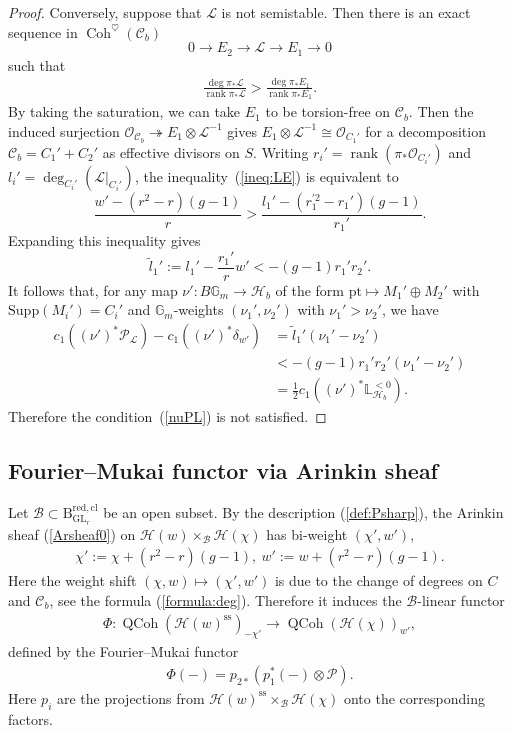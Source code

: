 \documentclass[11pt,oneside,a4paper,mathscr]{amsart}
\theoremstyle{definition}
\newcommand{\QCoh}{\operatorname{QCoh}}
\newcommand{\cH}{\mathcal{H}}
\newcommand{\cB}{\mathcal{B}}
\newcommand{\cC}{\mathcal{C}}
\newcommand{\cP}{\mathcal{P}}
\newcommand{\cO}{\mathcal{O}}
\newcommand{\bgm}{B\mathbb{G}_m}
\newcommand{\rank}{\operatorname{rank}}
\newcommand{\rB}{\mathrm{B}}
\newcommand{\Coh}{\operatorname{Coh}}
\newcommand{\GL}{\operatorname{GL}}
\begin{document}
\begin{proof}
Conversely, suppose that $\mathcal{L}$ is not semistable. Then there is
an exact sequence in $\Coh^{\heartsuit}(\cC_b)$
\[
    0\to E_2 \to \mathcal{L} \to E_1 \to 0
\]
such that
\begin{align}\label{ineq:LE}
\frac{\deg \pi_{*}\mathcal{L}}{\rank \pi_{*}\mathcal{L}}>
\frac{\deg \pi_{*}E_1}{\rank \pi_{*}E_1}.
\end{align}
By taking the saturation, we can take $E_1$ to be torsion-free on $\cC_b$. 
Then the induced surjection
$\mathcal{O}_{\cC_b} \twoheadrightarrow E_1 \otimes \mathcal{L}^{-1}$
gives $E_1 \otimes \mathcal{L}^{-1}\cong \cO_{C_1'}$ for a decomposition
$\cC_b=C_1'+C_2'$ as effective divisors on $S$. Writing
$r_i'=\rank(\pi_{*}\cO_{C_i'})$ and
$l_i'=\deg_{C_i'}(\mathcal{L}|_{C_i'})$, the inequality~(\ref{ineq:LE}) is
equivalent to
\[
\frac{w'-(r^2-r)(g-1)}{r}
>
\frac{l_1'-(r_1^{'2}-r_1')(g-1)}{r_1'}.
\]
Expanding this inequality gives
\[
    \widetilde{l}_1'
    :=
    l_1'-\frac{r_1'}{r}w'
    <
    -(g-1)r_1' r_2'.
\]
It follows that, for any map $\nu'\colon \bgm \to \cH_b$ of the form
$\mathrm{pt} \mapsto M_1'\oplus M_2'$ with
$\mathrm{Supp}(M_i')=C_i'$ and $\mathbb{G}_m$-weights $(\nu_1', \nu_2')$
with 
$\nu_1'>\nu_2'$, we have
\begin{align*}
   c_1((\nu')^* \cP_{\mathcal{L}})
   -c_1((\nu')^* \delta_{w'})
   &=
   \widetilde{l}_1'(\nu_1'-\nu_2')  \\
   &<
   -(g-1)r_1' r_2'(\nu_1'-\nu_2') \\
   &=
   \frac{1}{2}c_1((\nu')^*\mathbb{L}_{\cH_b}^{<0}).
\end{align*}
Therefore the condition~(\ref{nuPL}) is not satisfied.
\end{proof}



\subsection{Fourier--Mukai functor via Arinkin sheaf}
Let $\cB \subset \rB_{\GL_r}^{\mathrm{red, cl}}$ be an open subset. 
By the description (\ref{def:Psharp}), 
the Arinkin sheaf (\ref{Arsheaf0}) on 
$\cH(w)\times_{\cB}\cH(\chi)$ has bi-weight 
$(\chi', w')$, 
\begin{align*}
    \chi':=\chi+(r^2-r)(g-1), \ w':=w+(r^2-r)(g-1).
\end{align*}
Here the weight shift $(\chi, w)\mapsto (\chi', w')$ is due to 
the change of degrees on $C$ and $\cC_b$, see the formula (\ref{formula:deg}). 
Therefore it induces the $\cB$-linear functor 
\begin{align}\label{induce:Phi0}
\Phi \colon 
    \QCoh(\cH(w)^{\mathrm{ss}})_{-\chi'} \to \QCoh(\cH(\chi))_{w'}, 
\end{align}
defined by the Fourier--Mukai functor
\begin{align*}
    \Phi(-)=p_{2*}(p_1^{*}(-)\otimes \cP).
\end{align*}
Here $p_i$ are the projections from $\cH(w)^{\mathrm{ss}}\times_{\cB}\cH(\chi)$ onto the corresponding factors. 
\end{document}
